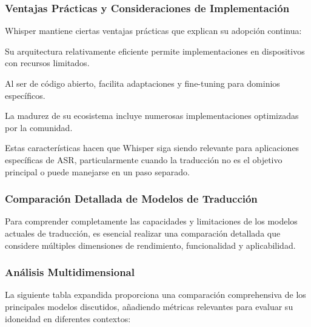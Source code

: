 \subsubsection{Ventajas Prácticas y Consideraciones de Implementación}
Whisper mantiene ciertas ventajas prácticas que explican su adopción continua:

Su arquitectura relativamente eficiente permite implementaciones en dispositivos con recursos limitados.

Al ser de código abierto, facilita adaptaciones y fine-tuning para dominios específicos.

La madurez de su ecosistema incluye numerosas implementaciones optimizadas por la comunidad.

Estas características hacen que Whisper siga siendo relevante para aplicaciones específicas de ASR, particularmente cuando la traducción no es el objetivo principal o puede manejarse en un paso separado.

\subsubsection{Comparación Detallada de Modelos de Traducción}
Para comprender completamente las capacidades y limitaciones de los modelos actuales de traducción, es esencial realizar una comparación detallada que considere múltiples dimensiones de rendimiento, funcionalidad y aplicabilidad.

\subsubsection{Análisis Multidimensional}
La siguiente tabla expandida proporciona una comparación comprehensiva de los principales modelos discutidos, añadiendo métricas relevantes para evaluar su idoneidad en diferentes contextos:

